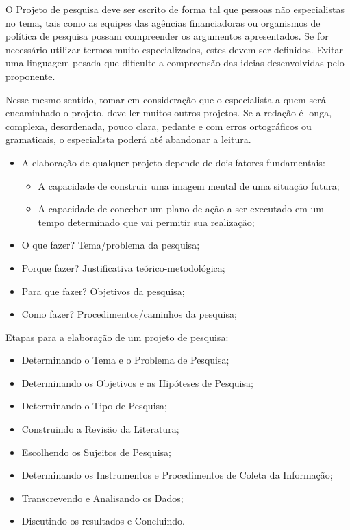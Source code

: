 O Projeto de pesquisa deve ser escrito de forma tal que pessoas não especialistas no tema, tais como as equipes das agências financiadoras ou organismos de política de pesquisa possam compreender os argumentos apresentados. Se for necessário utilizar termos muito especializados, estes devem ser definidos. Evitar uma linguagem pesada que dificulte a compreensão das ideias desenvolvidas pelo proponente.

Nesse mesmo sentido, tomar em consideração que o especialista a quem será encaminhado o projeto, deve ler muitos outros projetos. Se a redação é longa, complexa, desordenada, pouco clara, pedante e com erros ortográficos ou gramaticais, o especialista poderá até abandonar a leitura.


\begin{itemize}
	\item A elaboração de qualquer projeto depende de dois fatores fundamentais: 
 	\begin{itemize}
	 	\item A capacidade de construir uma imagem mental de uma situação futura;
 		\item A capacidade de conceber um plano de ação a ser executado em um tempo determinado que vai permitir sua realização;
 	\end{itemize}
  
    \item O que fazer? Tema/problema da pesquisa;
    \item Porque fazer? Justificativa teórico-metodológica;
    \item Para que fazer? Objetivos da pesquisa;
    \item Como fazer? Procedimentos/caminhos da pesquisa;

\end{itemize}

Etapas para a elaboração de um projeto de pesquisa:

\begin{itemize}
	\item Determinando o Tema e o Problema de Pesquisa;
	\item Determinando os Objetivos e as Hipóteses de Pesquisa;
	\item Determinando o Tipo de Pesquisa;
	\item Construindo a Revisão da Literatura;
	\item Escolhendo os Sujeitos de Pesquisa;
	\item Determinando os Instrumentos e Procedimentos de Coleta da Informação;
	\item Transcrevendo e Analisando os Dados;
	\item Discutindo os resultados e Concluindo.
\end{itemize}

